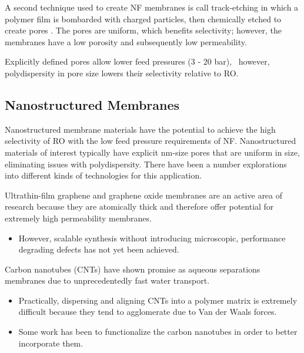   A second technique used to create NF membranes is call track-etching in which a polymer
  film is bombarded with charged particles, then chemically etched to create pores
  \cite{apel_track_2001}. The pores are uniform, which benefits selectivity;
  however, the membranes have a low porosity and subsequently low permeability. 
  
  Explicitly defined pores allow lower feed pressures (3 - 20 bar),~\cite{van_der_bruggen_review_2003}
  however, polydispersity in pore size lowers their selectivity relative to RO.
  
  \subsection{Nanostructured Membranes}
  
  Nanostructured membrane materials have the potential to achieve the high selectivity
  of RO with the low feed pressure requirements of NF. Nanostructured materials of 
  interest typically have explicit nm-size pores that are uniform in size, eliminating
  issues with polydispersity. There have been a number explorations into different
  kinds of technologies for this application.
  
  Ultrathin-film
  graphene and graphene oxide membranes are an active area of research because
  they are atomically thick and therefore offer potential for extremely high
  permeability membranes.~\cite{humplik_nanostructured_2011} 
  \begin{itemize}  
    \item However, scalable synthesis without introducing microscopic, performance
    degrading defects has not yet been achieved.~\cite{cohen-tanugi_multilayer_2016,wei_multilayered_2018}
  \end{itemize}    
  
  Carbon nanotubes (CNTs) have shown promise as aqueous separations membranes
  due to unprecedentedly fast water transport.\cite{humplik_nanostructured_2011,hummer_water_2001}
  \begin{itemize}
	\item Practically, dispersing and aligning CNTs into a polymer matrix is extremely
    difficult because they tend to agglomerate due to Van der Waals forces.~\cite{sahoo_polymer_2010}
    \item Some work has been to functionalize the carbon nanotubes in order to better incorporate them. %
  \end{itemize}
  
